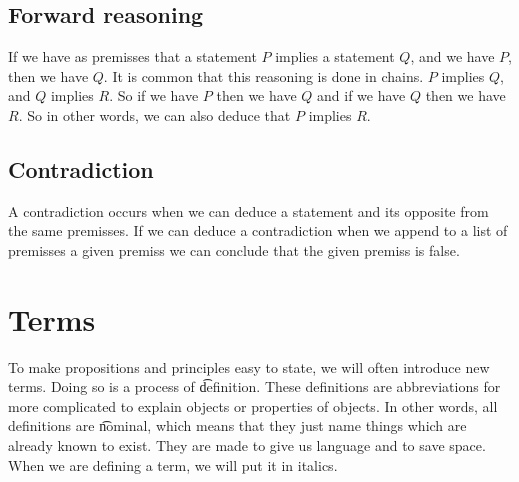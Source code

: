 \subsection*{Forward reasoning}

If we have as premisses that a statement $P$ implies a statement $Q$, and we have $P$, then we have $Q$.
It is common that this reasoning is done in chains.
$P$ implies $Q$, and $Q$ implies $R$. So if we have $P$ then we have $Q$ and if we have $Q$ then we have $R$.
So in other words, we can also deduce that $P$ implies $R$.

\subsection*{Contradiction}

A contradiction occurs when we can deduce a statement and its opposite from the same premisses.
If we can deduce a contradiction when we append to a list of premisses a given premiss we can conclude that the given premiss is false.

\section*{Terms}

To make propositions and principles easy to state, we will often introduce new terms.
Doing so is a process of \t{definition}.
These definitions are abbreviations for more complicated to explain objects or properties of objects.
In other words, all definitions are \t{nominal}, which means that they just name things which are already known to exist.
They are made to give us language and to save space.
When we are defining a term, we will put it in italics.


\blankpage